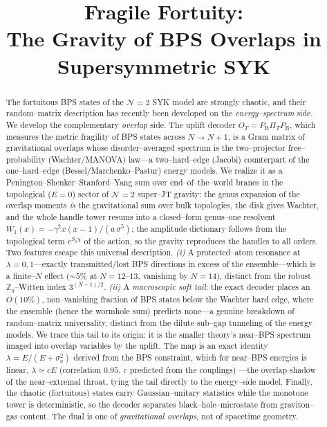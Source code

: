 \documentclass[11pt]{article}
\title{\bf Fragile Fortuity:\\ The Gravity of BPS Overlaps in Supersymmetric SYK}
\author{}
\date{}
\newcommand{\PB}{P_{\mathrm B}}
\newcommand{\PiT}{\Pi_T}
\newcommand{\OT}{O_T}
\begin{document}
\maketitle

\begin{abstract}
\noindent
The fortuitous BPS states of the $\mathcal N{=}2$ SYK model are strongly chaotic, and their
random--matrix description has recently been developed on the \emph{energy--spectrum} side. We
develop the complementary \emph{overlap} side. The uplift decoder $\OT=\PB\PiT\PB$, which measures the
metric fragility of BPS states across $N\!\to\!N{+}1$, is a Gram matrix of gravitational overlaps whose
disorder--averaged spectrum is the two--projector free--probability (Wachter/MANOVA) law---a
two--hard--edge (Jacobi) counterpart of the one--hard--edge (Bessel/Marchenko--Pastur) energy
models. We realize it as a Penington--Shenker--Stanford--Yang sum over end--of--the--world branes in
the topological ($E=0$) sector of $\mathcal N{=}2$ super--JT gravity: the genus expansion of the
overlap moments \emph{is} the gravitational sum over bulk topologies, the disk gives Wachter, and the
whole handle tower resums into a closed--form genus--one resolvent
$W_1(x)=-\gamma^2 x(x-1)/(a\,\sigma^5)$; the amplitude dictionary follows from the topological term
$e^{S_0\chi}$ of the action, so the gravity reproduces the handles to all orders. Two features escape
this universal description. \emph{(i)} A protected--atom resonance at $\lambda=0,1$---exactly
transmitted/lost BPS directions in excess of the ensemble---which is a finite--$N$ effect ($\sim\!5\%$
at $N\!=\!12$--$13$, vanishing by $N\!=\!14$), distinct from the robust $\mathbb Z_q$--Witten index
$3^{(N-1)/2}$. \emph{(ii)} A \emph{macroscopic soft tail}: the exact
decoder places an $O(10\%)$, non--vanishing fraction of BPS states below the Wachter hard edge, where
the ensemble (hence the wormhole sum) predicts none---a genuine breakdown of random--matrix
universality, distinct from the dilute sub--gap tunneling of the energy models. We trace this tail to
its origin: it is the smaller theory's near--BPS spectrum imaged into overlap variables by the uplift.
The map is an exact identity $\lambda=E/(E+\sigma_a^2)$ derived from the BPS constraint, which for
near--BPS energies is linear, $\lambda\simeq cE$ (correlation $0.95$, $c$ predicted from the couplings)
---the overlap shadow of the near--extremal throat, tying the tail directly to the energy--side model. Finally, the chaotic (fortuitous) states carry
Gaussian--unitary statistics while the monotone tower is deterministic, so the decoder separates
black--hole--microstate from graviton--gas content. The dual is one of \emph{gravitational overlaps},
not of spacetime geometry.
\end{abstract}
\end{document}
